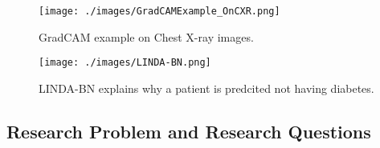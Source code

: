 \begin{figure}[!h]
    \centering
    \texttt{[image: ./images/GradCAMExample\_OnCXR.png]}
    \caption{GradCAM example on Chest X-ray images. \citep{Teixeira2021LIMEAndGradCAMOnCXR}}
    \label{fig: GradCAMExample_OnCXR}
\end{figure}

\begin{figure}[!h]
    \centering
    \texttt{[image: ./images/LINDA-BN.png]}
    \caption{LINDA-BN explains why a patient is predcited not having diabetes. \citep{Moreira2021LINDA}}
    \label{fig: LINDA-BN_diabetes}
\end{figure}

\citep{Ruder2017MultitaskLearning}









\lipsum[1]

\subsection{Research Problem and Research Questions}

\lipsum[1]



